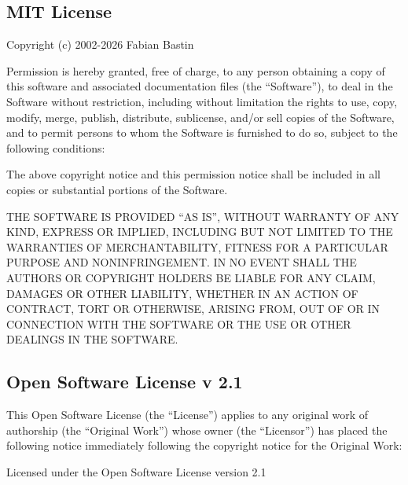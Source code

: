 \begin{small}

\subsection{MIT License}

Copyright (c) 2002-2026 Fabian Bastin

Permission is hereby granted, free of charge, to any person obtaining a copy
of this software and associated documentation files (the ``Software''), to deal
in the Software without restriction, including without limitation the rights
to use, copy, modify, merge, publish, distribute, sublicense, and/or sell
copies of the Software, and to permit persons to whom the Software is
furnished to do so, subject to the following conditions:

The above copyright notice and this permission notice shall be included in all
copies or substantial portions of the Software.

\noindent
THE SOFTWARE IS PROVIDED ``AS IS'', WITHOUT WARRANTY OF ANY KIND, EXPRESS OR
IMPLIED, INCLUDING BUT NOT LIMITED TO THE WARRANTIES OF MERCHANTABILITY,
FITNESS FOR A PARTICULAR PURPOSE AND NONINFRINGEMENT. IN NO EVENT SHALL THE
AUTHORS OR COPYRIGHT HOLDERS BE LIABLE FOR ANY CLAIM, DAMAGES OR OTHER
LIABILITY, WHETHER IN AN ACTION OF CONTRACT, TORT OR OTHERWISE, ARISING FROM,
OUT OF OR IN CONNECTION WITH THE SOFTWARE OR THE USE OR OTHER DEALINGS IN THE
SOFTWARE.

\subsection{Open Software License v 2.1}

This Open Software License (the ``License'') applies to any original
work of authorship (the ``Original Work'') whose owner (the ``Licensor'')
has placed the following notice immediately following the copyright
notice for the Original Work:
\begin{center}
Licensed under the Open Software License version 2.1
\end{center}


\end{small}
